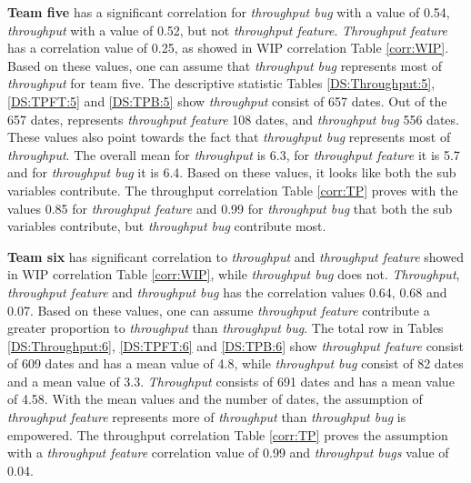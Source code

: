 \documentclass[UKenglish]{ifimaster}  %
\begin{document}
\textbf{Team five} has a significant correlation for \textit{throughput bug} with a value of 0.54, \textit{throughput} with a value of 0.52, but not \textit{throughput feature}. \textit{Throughput feature} has a correlation value of 0.25, as showed in WIP correlation Table \ref{corr:WIP}. Based on these values, one can assume that \textit{throughput bug} represents most of \textit{throughput} for team five. The descriptive statistic Tables \ref{DS:Throughput:5}, \ref{DS:TPFT:5} and \ref{DS:TPB:5} show \textit{throughput} consist of 657 dates. Out of the 657 dates, represents \textit{throughput feature} 108 dates, and \textit{throughput bug} 556 dates. These values also point towards the fact that \textit{throughput bug} represents most of \textit{throughput}. The overall mean for \textit{throughput} is 6.3, for \textit{throughput feature} it is 5.7 and for \textit{throughput bug} it is 6.4. Based on these values, it looks like both the sub variables contribute. The throughput correlation Table \ref{corr:TP} proves with the values 0.85 for \textit{throughput feature} and 0.99 for \textit{throughput bug} that both the sub variables contribute, but \textit{throughput bug} contribute most.



\textbf{Team six} has significant correlation to \textit{throughput} and \textit{throughput feature} showed in WIP correlation Table \ref{corr:WIP}, while \textit{throughput bug} does not. \textit{Throughput}, \textit{throughput feature} and \textit{throughput bug} has the correlation values 0.64, 0.68 and 0.07. Based on these values, one can assume \textit{throughput feature} contribute a greater proportion to \textit{throughput} than \textit{throughput bug}. The total row in Tables \ref{DS:Throughput:6},  \ref{DS:TPFT:6} and \ref{DS:TPB:6} show \textit{throughput feature} consist of 609 dates and has a mean value of 4.8, while \textit{throughput bug} consist of 82 dates  and a mean value of 3.3. \textit{Throughput} consists of 691 dates and has a mean value of 4.58. With the mean values and the number of dates, the assumption of \textit{throughput feature} represents more of \textit{throughput} than \textit{throughput bug} is empowered. The throughput correlation Table \ref{corr:TP} proves the assumption with a \textit{throughput feature}  correlation value of 0.99 and \textit{throughput bugs}  value of 0.04. 
\end{document}
